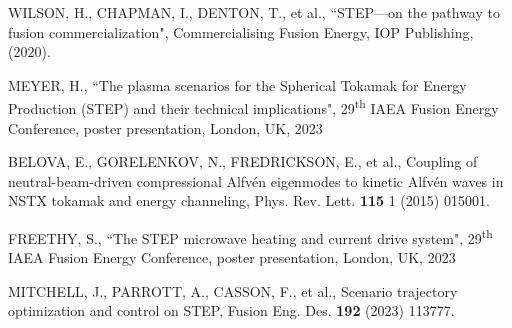 \documentclass[10pt, a4paper, twoside]{article}
\begin{document}
\fontsize{9}{12}\selectfont
\setlength{\parskip}{0pt}
\begin{thebibliography}{9}

    WILSON, H., CHAPMAN, I., DENTON, T., et al., 
    ``STEP---on the pathway to fusion commercialization", 
    Commercialising Fusion Energy, 
    IOP Publishing, 
    (2020).

    MEYER, H.,
    ``The plasma scenarios for the Spherical Tokamak for Energy Production (STEP) and their technical implications",
    29\textsuperscript{th} IAEA Fusion Energy Conference,
    poster presentation, 
    London, UK, 
    2023

    BELOVA, E., GORELENKOV, N., FREDRICKSON, E., et al., 
    Coupling of neutral-beam-driven compressional Alfv\'en eigenmodes to kinetic Alfv\'en waves in NSTX tokamak and energy channeling, 
    Phys. Rev. Lett. 
    \textbf{115} 1 
    (2015) 
    015001.

    FREETHY, S.,
    ``The STEP microwave heating and current drive system",
    29\textsuperscript{th} IAEA Fusion Energy Conference,
    poster presentation, 
    London, UK, 
    2023

    MITCHELL, J., PARROTT, A., CASSON, F., et al.,
    Scenario trajectory optimization and control on STEP,
    Fusion Eng. Des.
    \textbf{192} 
    (2023) 
    113777.



\end{thebibliography}
\end{document}
